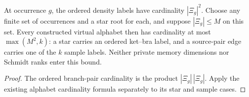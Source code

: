 \begin{theorem}
    \label{thm:peps_original_source_alphabet}
    \leanok
    At occurrence $g$, the ordered density labels have cardinality $|\Xi_g|^2$.
    Choose any finite set of occurrences and a star root for each, and suppose
    $|\Xi_g|\le M$ on this set. Every constructed virtual alphabet then has
    cardinality at most $\max(M^2,k)$: a star carries an ordered ket--bra label,
    and a source-pair edge carries one of the $k$ sample labels. Neither private
    memory dimensions nor Schmidt ranks enter this bound.
\end{theorem}

\begin{proof}
    \leanok
    The ordered branch-pair cardinality is the product $|\Xi_g|\,|\Xi_g|$.
    Apply the existing alphabet cardinality formula separately to its star and
    sample cases.
\end{proof}
